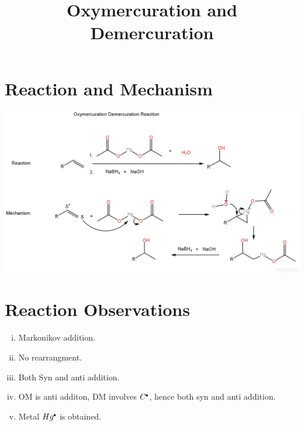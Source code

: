 \documentclass{article}
\title{Oxymercuration and Demercuration}
\author{}
\date{}
\newcommand*\fullcirc[1][0.3ex]{\tikz\fill (0,0) circle (#1);}
\begin{document}
\maketitle

\section{Reaction and Mechanism}
\begin{center}
    \includegraphics[scale=0.22]{OMDM_1722369977375.JPEG}
\end{center}
\section{Reaction Observations}
    \begin{enumerate}[i.]
        \item Markonikov addition.
        \item No rearrangment.
        \item Both Syn and anti addition.
        \item OM is anti additon, DM involves $C^{\fullcirc}$, hence both syn and anti addition.
        \item Metal $Hg^{\fullcirc}$ is obtained.
    \end{enumerate}
\end{document}
